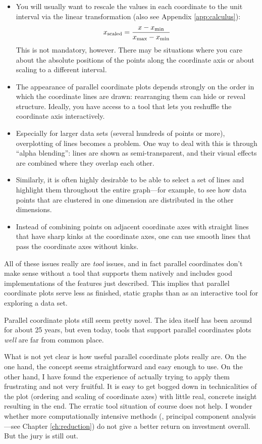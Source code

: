 \begin{itemize}
\item You will usually want to rescale the values in each
  coordinate to the unit interval via the linear transformation
  (also see Appendix \ref{app:calculus}):
  \[
  x_{{\rm scaled}} 
    = \frac{x - x_{{\rm min}}}{x_{{\rm max}} - x_{{\rm min}}}
  \]
  This is not mandatory, however. There may be situations where
  you care about the absolute positions of the points along the
  coordinate axis or about scaling to a different interval.
\item The appearance of parallel coordinate plots depends strongly on
  the order in which the coordinate lines are drawn: rearranging them
  can hide or reveal structure. Ideally, you have access to a tool
  that lets you reshuffle the coordinate axis interactively.
\item Especially for larger data sets (several hundreds of points
  or more), overplotting of lines becomes a problem. One way to deal
  with this is through ``alpha blending'': lines are shown as
  semi-transparent, and their visual effects are combined where they
  overlap each other.
\item Similarly, it is often highly desirable to be able to select a
  set of lines and highlight them throughout the entire graph---for
  example, to see how data points that are clustered in one dimension
  are distributed in the other dimensions.
\item Instead of combining points on adjacent coordinate axes with
  straight lines that have sharp kinks at the coordinate axes, one
  can use smooth lines that pass the coordinate axes without kinks.
\end{itemize}

All of these issues really are \emph{tool} issues, and in fact
parallel coordinates don't make sense without a tool that supports
them natively and includes good implementations of the features just
described. This implies that parallel coordinate plots serve less as
finished, static graphs than as an interactive tool for exploring a
data set.

Parallel coordinate plots still seem pretty novel. The idea itself has
been around for about 25 years, but even today, tools that support
parallel coordinates plots \emph{well} are far from common place.

What is not yet clear is how useful parallel coordinate plots really
are. On the one hand, the concept seems straightforward and easy
enough to use. On the other hand, I have found the experience of
actually trying to apply them frustrating and not very fruitful. It is
easy to get bogged down in technicalities of the plot (ordering and
scaling of coordinate axes) with little real, concrete insight
resulting in the end. The erratic tool situation of course does not
help.  I wonder whether more computationally intensive methods (\eg,
principal component analysis---see Chapter \ref{ch:reduction}) do not
give a better return on investment overall.  But the jury is still
out.
%
%

